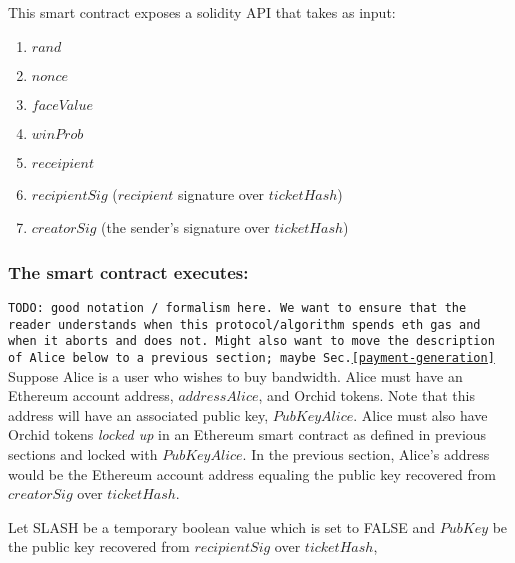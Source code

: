 This smart contract exposes a solidity API that takes as input:
\begin{enumerate}%
  \item $rand$
  \item $nonce$
  \item $faceValue$
  \item $winProb$
  \item $receipient$
  \item $recipientSig$ ($recipient$ signature over $ticketHash$)
  \item $creatorSig$ (the sender's signature over $ticketHash$)
\end{enumerate}

\subsubsection{The smart contract executes:}

{\color{red} \texttt{TODO: good notation / formalism here. We want to ensure that the reader understands when this protocol/algorithm spends eth gas and when it aborts and does not. Might also want to move the description of Alice below to a previous section; maybe Sec.\ref{payment-generation}}}\\

Suppose Alice is a user who wishes to buy bandwidth. Alice must have an Ethereum account address, $addressAlice$, and Orchid tokens. Note that this address will have an associated public key, $PubKeyAlice$. Alice must also have Orchid tokens \textit{locked up} in an Ethereum smart contract as defined in previous sections and locked with $PubKeyAlice$. In the previous section, Alice's address would be the Ethereum account address equaling the public key recovered from $creatorSig$ over $ticketHash$.

Let SLASH be a temporary boolean value which is set to FALSE and $PubKey$ be the public key recovered from $recipientSig$ over $ticketHash$,

